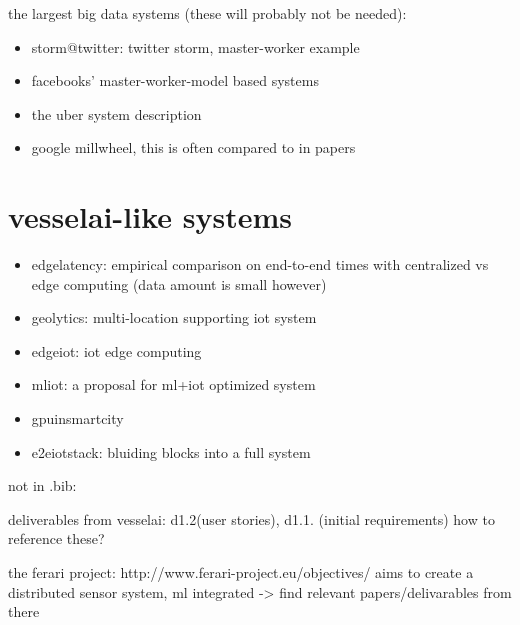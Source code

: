 \documentclass{article}
\begin{document}
the largest big data systems (these will probably not be needed):

\begin{itemize}
    \item \cite{storm@twitter} storm@twitter: twitter storm, master-worker example
    \item \cite{facebook} facebooks' master-worker-model based systems
    \item \cite{uber} the uber system description
    \item \cite{millwheel} google millwheel, this is often compared to in papers 
\end{itemize} 


\chapter{vesselai-like systems}

\begin{itemize}
    \item \cite{edgelatency} edgelatency: empirical comparison on end-to-end times with centralized vs edge computing (data amount is small however)
    \item \cite{geolytics} geolytics: multi-location supporting iot system
    \item \cite{edgeiot} edgeiot: iot edge computing
    \item \cite{mliot} mliot: a proposal for ml+iot optimized system
    \item \cite{gpuinsmartcity} gpuinsmartcity
    \item \cite{e2eiotstack} e2eiotstack: bluiding blocks into a full system
\end{itemize}

not in .bib:

deliverables from vesselai: d1.2(user stories), d1.1. (initial requirements) how to reference these?

the ferari project: http://www.ferari-project.eu/objectives/ aims to create a distributed sensor system, ml integrated
-> find relevant papers/delivarables from there

\printbibliography
\end{document}
